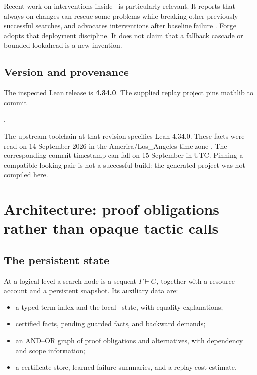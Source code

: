 Recent work on interventions inside \grind\ is particularly relevant. It
reports that always-on changes can rescue some problems while breaking other
previously successful searches, and advocates interventions after baseline
failure \cite{interventions}. Forge adopts that deployment discipline. It does
not claim that a fallback cascade or bounded lookahead is a new invention.

\subsection{Version and provenance}

The inspected Lean release is \textbf{4.34.0}. The supplied replay project pins
mathlib to commit
\begin{center}
.
\end{center}
The upstream toolchain at that revision specifies Lean 4.34.0. These facts were
read on 14 September 2026 in the America/Los\_Angeles time zone
\cite{lean-release,mathlib-revision}. The corresponding commit timestamp can
fall on 15 September in UTC. Pinning a compatible-looking pair is not a
successful build: the generated project was not compiled here.

\section{Architecture: proof obligations rather than opaque tactic calls}

\subsection{The persistent state}

At a logical level a search node is a sequent $\Gamma\vdash G$, together with a
resource account and a persistent snapshot. Its auxiliary data are:
\begin{itemize}
\item a typed term index and the local \grind\ state, with equality explanations;
\item certified facts, pending guarded facts, and backward demands;
\item an AND--OR graph of proof obligations and alternatives, with dependency
and scope information;
\item a certificate store, learned failure summaries, and a replay-cost estimate.
\end{itemize}

